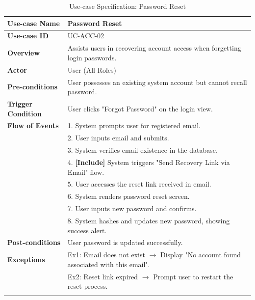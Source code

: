 \newpage
\begin{longtable}{|p{3.5cm}|p{11.5cm}|}
    \hline
    \textbf{Use-case Name} & \textbf{Password Reset} \\
    \hline
    \textbf{Use-case ID} & UC-ACC-02 \\
    \hline
    \textbf{Overview} & Assists users in recovering account access when forgetting login passwords. \\
    \hline
    \textbf{Actor} & User (All Roles) \\
    \hline
    \textbf{Pre-conditions} & User possesses an existing system account but cannot recall password. \\
    \hline
    \textbf{Trigger Condition} & User clicks "Forgot Password" on the login view. \\
    \hline
    \textbf{Flow of Events} & 
    1. System prompts user for registered email.\\ 
 & 
    2. User inputs email and submits.\\ 
 & 
    3. System verifies email existence in the database.\\ 
 & 
    4. \textbf{[Include]} System triggers "Send Recovery Link via Email" flow.\\ 
 & 
    5. User accesses the reset link received in email.\\ 
 & 
    6. System renders password reset screen.\\ 
 & 
    7. User inputs new password and confirms.\\ 
 & 
    8. System hashes and updates new password, showing success alert. \\
    \hline
    \textbf{Post-conditions} & User password is updated successfully. \\
    \hline
    \textbf{Exceptions} & 
    Ex1: Email does not exist $\rightarrow$ Display "No account found associated with this email".\\ 
 & 
    Ex2: Reset link expired $\rightarrow$ Prompt user to restart the reset process. \\
    \hline
    \caption{Use-case Specification: Password Reset} \\
\end{longtable}

